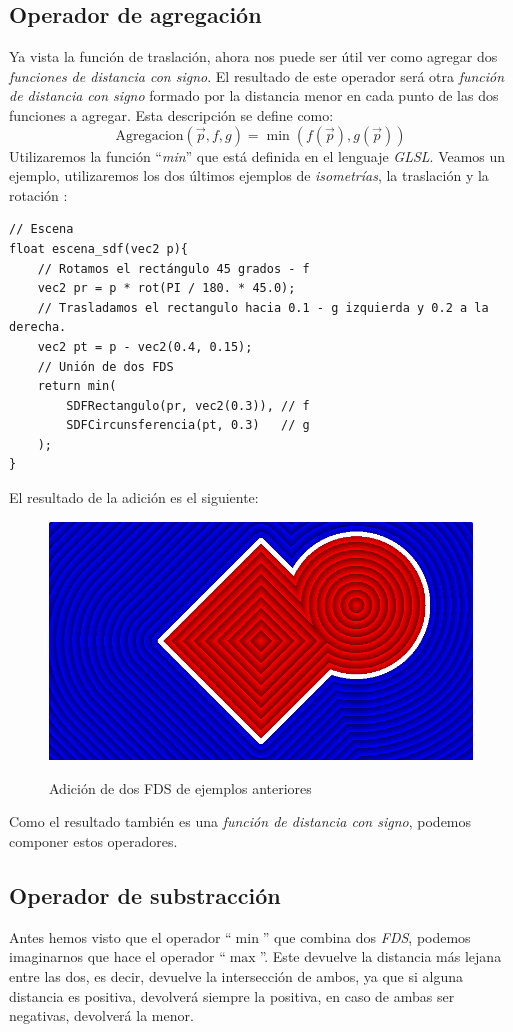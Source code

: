 \subsection{Operador de agregación}
Ya vista la función de traslación, ahora nos puede ser útil ver como agregar dos \textit{funciones de distancia con signo}. El resultado de este operador será otra \textit{función de distancia con signo} formado por la distancia menor en cada punto de las dos funciones a agregar. Esta descripción se define como:
\[\text{Agregacion}(\Vec{p}, f, g) = \min(f(\Vec{p}), g(\Vec{p})) \]
Utilizaremos la función \enquote{\textit{min}} que está definida en el lenguaje \textit{GLSL}. Veamos un ejemplo, utilizaremos los dos últimos ejemplos de \textit{isometrías}, la traslación  y la rotación :
\begin{lstlisting}
// Escena
float escena_sdf(vec2 p){
    // Rotamos el rectángulo 45 grados - f
    vec2 pr = p * rot(PI / 180. * 45.0);
    // Trasladamos el rectangulo hacia 0.1 - g izquierda y 0.2 a la derecha.
    vec2 pt = p - vec2(0.4, 0.15);
    // Unión de dos FDS
    return min(
        SDFRectangulo(pr, vec2(0.3)), // f
        SDFCircunsferencia(pt, 0.3)   // g
    );
}
\end{lstlisting}

El resultado de la adición es el siguiente:

\begin{figure}[H]
  \centering
  \captionsetup{justification=centering}%
  \includegraphics[width=1.0\textwidth]{secciones/imagenes/sdf/2d/sdf_add.png}\label{fig:add}
  \caption{ Adición de dos FDS de ejemplos anteriores}
\end{figure}
Como el resultado también es una \textit{función de distancia con signo}, podemos componer estos operadores.
\subsection{Operador de substracción}
Antes hemos visto que el operador \enquote{\(\min\)} que combina dos \textit{FDS}, podemos imaginarnos que hace el operador \enquote{\(\max\)}. Este devuelve la distancia más lejana entre las dos, es decir, devuelve la intersección de ambos, ya que si alguna distancia es positiva, devolverá siempre la positiva, en caso de ambas ser negativas, devolverá la menor.

